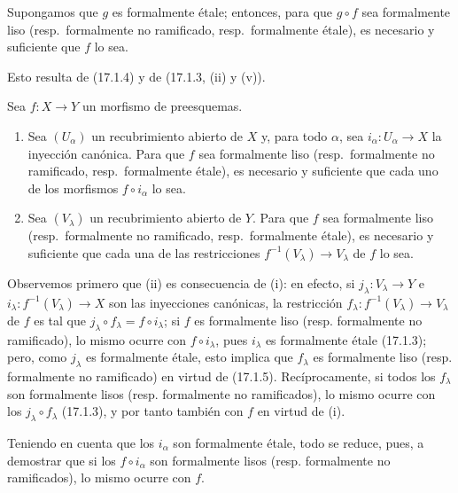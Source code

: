 \begin{corollary}[17.1.5]
\label{IV.17.1.5}
Supongamos que $g$ es formalmente étale; entonces, para que $g\circ f$ sea formalmente liso \textup{(resp.}\ formalmente no ramificado, \textup{resp.}\ formalmente étale\textup{)}, es necesario y suficiente que $f$ lo sea.
\end{corollary}

Esto resulta de (17.1.4) y de (17.1.3, (ii) y (v)).

\begin{proposition}[17.1.6]
\label{IV.17.1.6}
Sea $f:X\to Y$ un morfismo de preesquemas.
\begin{enumerate}
  \item[\textup{(i)}] Sea $(U_\alpha)$ un recubrimiento abierto de $X$ y, para todo $\alpha$, sea $i_\alpha:U_\alpha\to X$ la inyección canónica. Para que $f$ sea formalmente liso \textup{(resp.}\ formalmente no ramificado, \textup{resp.}\ formalmente étale\textup{)}, es necesario y suficiente que cada uno de los morfismos $f\circ i_\alpha$ lo sea.
  \item[\textup{(ii)}] Sea $(V_\lambda)$ un recubrimiento abierto de $Y$. Para que $f$ sea formalmente liso \textup{(resp.}\ formalmente no ramificado, \textup{resp.}\ formalmente étale\textup{)}, es necesario y suficiente que cada una de las restricciones $f^{-1}(V_\lambda)\to V_\lambda$ de $f$ lo sea.
\end{enumerate}
\end{proposition}

Observemos primero que (ii) es consecuencia de (i): en efecto, si $j_\lambda:V_\lambda\to Y$ e $i_\lambda:f^{-1}(V_\lambda)\to X$ son las inyecciones canónicas, la restricción $f_\lambda:f^{-1}(V_\lambda)\to V_\lambda$ de $f$ es tal que $j_\lambda\circ f_\lambda=f\circ i_\lambda$; si $f$ es formalmente liso (resp. formalmente no ramificado), lo mismo ocurre con $f\circ i_\lambda$, pues $i_\lambda$ es formalmente étale (17.1.3); pero, como $j_\lambda$ es formalmente étale, esto implica que $f_\lambda$ es formalmente liso (resp. formalmente no ramificado) en virtud de (17.1.5). Recíprocamente, si todos los $f_\lambda$ son formalmente lisos (resp. formalmente no ramificados), lo mismo ocurre con los $j_\lambda\circ f_\lambda$ (17.1.3), y por tanto también con $f$ en virtud de (i).

Teniendo en cuenta que los $i_\alpha$ son formalmente étale, todo se reduce, pues, a demostrar que si los $f\circ i_\alpha$ son formalmente lisos (resp. formalmente no ramificados), lo mismo ocurre con $f$.

